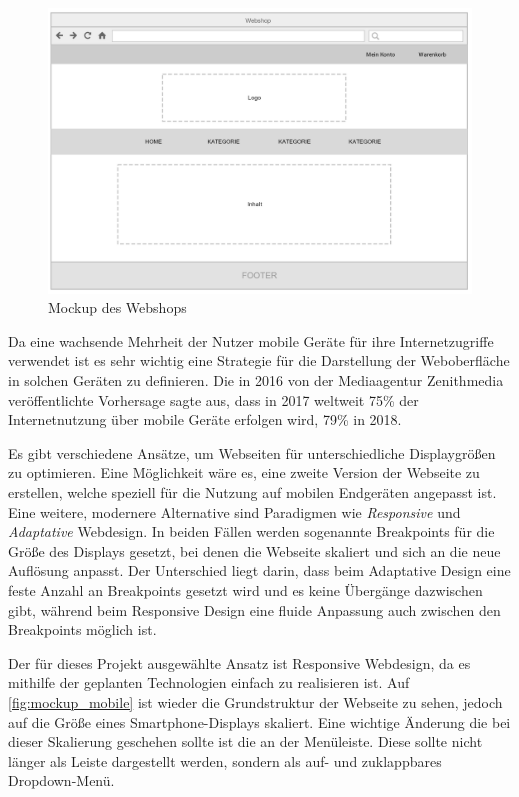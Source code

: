 \begin{figure}[ht!]
	\centering
	\includegraphics[width=\linewidth]{bilder/kap6/mockup_shop.png}
	\caption{Mockup des Webshops}
	\label{fig:mockup_shop}
\end{figure}

Da eine wachsende Mehrheit der Nutzer mobile Geräte für ihre Internetzugriffe verwendet ist es sehr wichtig eine Strategie für die Darstellung der Weboberfläche in solchen Geräten zu definieren. Die in 2016 von der Mediaagentur Zenithmedia veröffentlichte Vorhersage sagte aus, dass in 2017 weltweit 75\% der Internetnutzung über mobile Geräte erfolgen wird, 79\% in 2018\cite{Zenithmedia2016}.

Es gibt verschiedene Ansätze, um Webseiten für unterschiedliche Displaygrößen zu optimieren. Eine Möglichkeit wäre es, eine zweite Version der Webseite zu erstellen, welche speziell für die Nutzung auf mobilen Endgeräten angepasst ist. Eine weitere, modernere Alternative sind Paradigmen wie \textit{Responsive} und \textit{Adaptative} Webdesign. In beiden Fällen werden sogenannte Breakpoints für die Größe des Displays gesetzt, bei denen die Webseite skaliert und sich an die neue Auflösung anpasst. Der Unterschied liegt darin, dass beim Adaptative Design eine feste Anzahl an Breakpoints gesetzt wird und es keine Übergänge dazwischen gibt, während beim Responsive Design eine fluide Anpassung auch zwischen den Breakpoints möglich ist.

Der für dieses Projekt ausgewählte Ansatz ist Responsive Webdesign, da es mithilfe der geplanten Technologien einfach zu realisieren ist. Auf \cref{fig:mockup_mobile} ist wieder die Grundstruktur der Webseite zu sehen, jedoch auf die Größe eines Smartphone-Displays skaliert. Eine wichtige Änderung die bei dieser Skalierung geschehen sollte ist die an der Menüleiste. Diese sollte nicht länger als Leiste dargestellt werden, sondern als auf- und zuklappbares Dropdown-Menü. 


